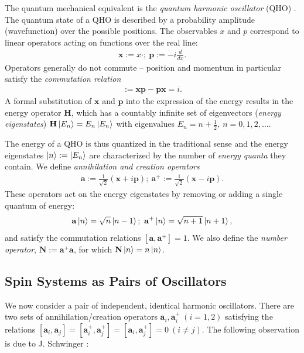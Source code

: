 \documentclass[final,3p,mathptmx]{elsarticle}
\begin{document}
The quantum mechanical equivalent is the \emph{quantum harmonic oscillator} (QHO) \cite{townsend2000modern}. The quantum state of a QHO is described by a probability amplitude (wavefunction) over the possible positions. The observables $x$ and $p$ correspond to linear operators acting on functions over the real line:
\begin{align}
\mathbf{x} := x \cdot;\ \mathbf{p} := -i\frac{d}{dx}.
\end{align}
Operators generally do not commute -- position and momentum in particular satisfy the \emph{commutation relation}
\begin{align}
[\mathbf{x}, \mathbf{p}] := \mathbf{x}\mathbf{p} - \mathbf{p}\mathbf{x} = i.
\end{align}
A formal substitution of $\mathbf{x}$ and $\mathbf{p}$ into the expression of the energy results in the energy operator $\mathbf{H}$, which has a countably infinite set of eigenvectors (\emph{energy eigenstates}) $\mathbf{H}\ket{E_{n}} = E_{n}\ket{E_{n}}$ with eigenvalues $E_{n} =  n + \frac{1}{2},\ n = 0, 1, 2, \ldots.$

The energy of a QHO is thus quantized in the traditional sense and the energy eigenstates $\ket{n} := \ket{E_{n}}$ are characterized by the number of \emph{energy quanta} they contain. We define \emph{annihilation and creation operators}
\begin{align}\label{eq:creat_def}
\mathbf{a} := \frac{1}{\sqrt{2}}\left( \mathbf{x} + i \mathbf{p} \right);\ \mathbf{a}^{+} :=  \frac{1}{\sqrt{2}}\left( \mathbf{x} - i \mathbf{p} \right).
\end{align} 
These operators act on the energy eigenstates by removing or adding a single quantum of energy: 
\begin{align}\label{eq:creat_effect}
\mathbf{a}\ket{n} = \sqrt{n}\ket{n-1};\ \mathbf{a}^{+}\ket{n} = \sqrt{n+1}\ket{n+1}, 
\end{align}
and satisfy the commutation relations $[\mathbf{a},\mathbf{a}^{+}] = 1$.
We also define the \emph{number operator}, $\mathbf{N} := \mathbf{a}^{+}\mathbf{a}$, for which $\mathbf{N}\ket{n} = n\ket{n}$.
\subsection{Spin Systems as Pairs of Oscillators}
We now consider a pair of independent, identical harmonic oscillators. There are two sets of annihilation/creation operators $ \mathbf{a}_{i}, \mathbf{a}^{+}_{i}\  (i = 1,2)$ satisfying the relations $[\mathbf{a}_{i},\mathbf{a}_{j}] = [\mathbf{a}^{+}_{i}, \mathbf{a}^{+}_{j}] = [\mathbf{a}_{i}, \mathbf{a}^{+}_{j}] = 0\  (i \neq j).$
The following observation is due to J. Schwinger \cite{schwinger1952angular}:
\end{document}
